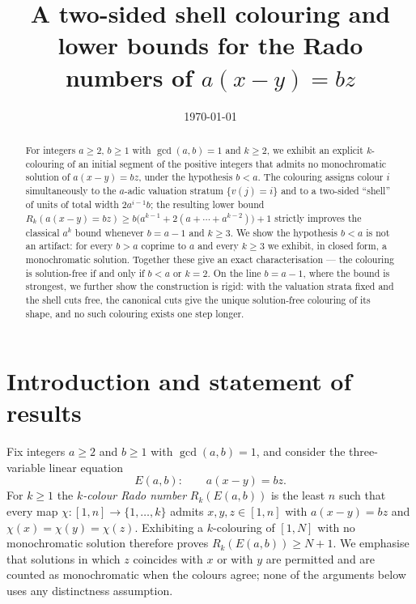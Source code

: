 \documentclass{amsart}
\theoremstyle{definition}
\newcommand{\Rk}{R_k}
\begin{document}
\title[Shell colourings for $a(x-y)=bz$]{A two-sided shell colouring
and lower bounds for the Rado numbers of $a(x-y)=bz$}

\author{}
\date{\today}

\begin{abstract}
For integers $a\ge 2$, $b\ge 1$ with $\gcd(a,b)=1$ and $k\ge 2$, we exhibit an
explicit $k$-colouring of an initial segment of the positive integers that
admits no monochromatic solution of $a(x-y)=bz$, under the hypothesis $b<a$.
The colouring assigns colour $i$ simultaneously to the $a$-adic valuation
stratum $\{v(j)=i\}$ and to a two-sided ``shell'' of units of total width
$2a^{i-1}b$; the resulting lower bound
$\Rk(a(x-y)=bz)\ge b\bigl(a^{k-1}+2(a+\cdots+a^{k-2})\bigr)+1$
strictly improves the classical $a^k$ bound whenever $b=a-1$ and $k\ge3$.  We
show the hypothesis $b<a$ is not an artifact: for every $b>a$ coprime to $a$
and every $k\ge3$ we exhibit, in closed form, a monochromatic solution.
Together these give an exact characterisation --- the colouring is
solution-free if and only if $b<a$ or $k=2$.  On the line $b=a-1$, where the
bound is strongest, we further show the construction is rigid: with the
valuation strata fixed and the shell cuts free, the canonical cuts give the
unique solution-free colouring of its shape, and no such colouring exists one
step longer.
\end{abstract}

\maketitle

\section{Introduction and statement of results}

Fix integers $a\ge 2$ and $b\ge 1$ with $\gcd(a,b)=1$, and consider the
three-variable linear equation
\[
  E(a,b):\qquad a(x-y)=bz .
\]
For $k\ge 1$ the \emph{$k$-colour Rado number} $\Rk(E(a,b))$ is the least $n$
such that every map $\chi\colon[1,n]\to\{1,\dots,k\}$ admits $x,y,z\in[1,n]$
with $a(x-y)=bz$ and $\chi(x)=\chi(y)=\chi(z)$.  Exhibiting a $k$-colouring of
$[1,N]$ with no monochromatic solution therefore proves
$\Rk(E(a,b))\ge N+1$.  We emphasise that solutions in which $z$ coincides with
$x$ or with $y$ are permitted and are counted as monochromatic when the colours
agree; none of the arguments below uses any distinctness assumption.
\end{document}
